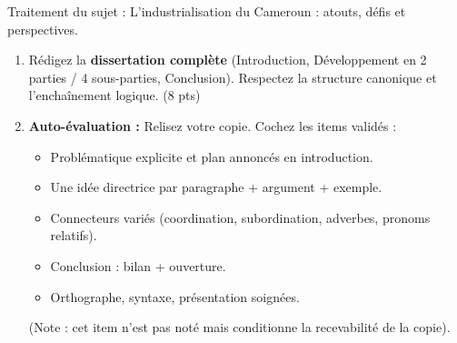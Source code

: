 \documentclass[11pt]{article}
\begin{document}
\begin{exercice}
Traitement du sujet : \og L'industrialisation du Cameroun : atouts, défis et perspectives. \fg
\begin{enumerate}
    \item Rédigez la \textbf{dissertation complète} (Introduction, Développement en 2 parties / 4 sous-parties, Conclusion). Respectez la structure canonique et l'enchaînement logique. (8 pts)
    \item \textbf{Auto-évaluation :} Relisez votre copie. Cochez les items validés :
    \begin{itemize}
        \item [ ] Problématique explicite et plan annoncés en introduction.
        \item [ ] Une idée directrice par paragraphe + argument + exemple.
        \item [ ] Connecteurs variés (coordination, subordination, adverbes, pronoms relatifs).
        \item [ ] Conclusion : bilan + ouverture.
        \item [ ] Orthographe, syntaxe, présentation soignées.
    \end{itemize}
    (Note : cet item n'est pas noté mais conditionne la recevabilité de la copie).
\end{enumerate}
\end{exercice}
\end{document}
